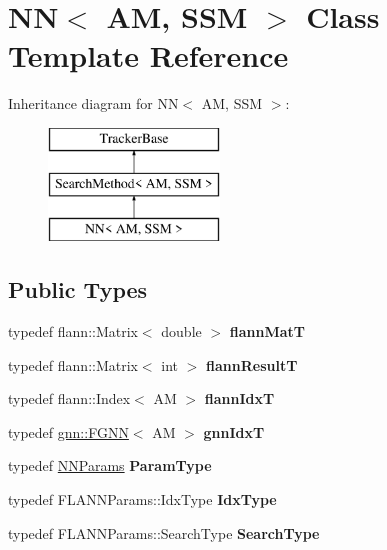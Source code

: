 \hypertarget{classNN}{\section{N\-N$<$ A\-M, S\-S\-M $>$ Class Template Reference}
\label{classNN}
}
Inheritance diagram for N\-N$<$ A\-M, S\-S\-M $>$\-:\begin{figure}[H]
\begin{center}
\leavevmode
\includegraphics[height=3.000000cm]{classNN}
\end{center}
\end{figure}
\subsection*{Public Types}
\begin{DoxyCompactItemize}
\item 
\hypertarget{classNN_aa5cae8e0bee5bb515d8c2811e837577e}{typedef flann\-::\-Matrix$<$ double $>$ {\bfseries flann\-Mat\-T}}\label{classNN_aa5cae8e0bee5bb515d8c2811e837577e}

\item 
\hypertarget{classNN_a190d7c63fbebec831b7094f7fc20cbff}{typedef flann\-::\-Matrix$<$ int $>$ {\bfseries flann\-Result\-T}}\label{classNN_a190d7c63fbebec831b7094f7fc20cbff}

\item 
\hypertarget{classNN_a6d795fb240bae9f80be71df163f6af60}{typedef flann\-::\-Index$<$ A\-M $>$ {\bfseries flann\-Idx\-T}}\label{classNN_a6d795fb240bae9f80be71df163f6af60}

\item 
\hypertarget{classNN_a8f53a73bb549c5ea6de81f43fefeb37d}{typedef \hyperlink{classgnn_1_1FGNN}{gnn\-::\-F\-G\-N\-N}$<$ A\-M $>$ {\bfseries gnn\-Idx\-T}}\label{classNN_a8f53a73bb549c5ea6de81f43fefeb37d}

\item 
\hypertarget{classNN_a013bad4bd75949d84bf942888d3c9a20}{typedef \hyperlink{structNNParams}{N\-N\-Params} {\bfseries Param\-Type}}\label{classNN_a013bad4bd75949d84bf942888d3c9a20}

\item 
\hypertarget{classNN_a0fc65be868478158e39582353ee4f4f2}{typedef F\-L\-A\-N\-N\-Params\-::\-Idx\-Type {\bfseries Idx\-Type}}\label{classNN_a0fc65be868478158e39582353ee4f4f2}

\item 
\hypertarget{classNN_afb22398137b0155ea7b3e6600f1f84be}{typedef F\-L\-A\-N\-N\-Params\-::\-Search\-Type {\bfseries Search\-Type}}\label{classNN_afb22398137b0155ea7b3e6600f1f84be}

\end{DoxyCompactItemize}
